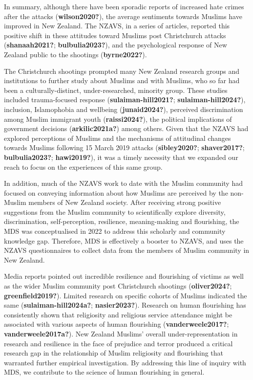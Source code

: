 \documentclass[
]{interact}
\begin{document}
In summary, although there have been sporadic reports of increased hate
crimes after the attacks (\textbf{wilson2020?}), the average sentiments
towards Muslims have improved in New Zealand. The NZAVS, in a series of
articles, reported this positive shift in these attitudes toward Muslims
post Christchurch attacks (\textbf{shanaah2021?};
\textbf{bulbulia2023?}), and the psychological response of New Zealand
public to the shootings (\textbf{byrne2022?}).

The Christchurch shootings prompted many New Zealand research groups and
institutions to further study about Muslims and with Muslims, who so far
had been a culturally-distinct, under-researched, minority group. These
studies included trauma-focused response (\textbf{sulaiman-hill2021?};
\textbf{sulaiman-hill2024?}), inclusion, Islamophobia and wellbeing
(\textbf{junaid2024?}), perceived discrimination among Muslim immigrant
youth (\textbf{raissi2024?}), the political implications of government
decisions (\textbf{arkilic2021a?}) among others. Given that the NZAVS
had explored perceptions of Muslims and the mechanisms of attitudinal
changes towards Muslims following 15 March 2019 attacks
(\textbf{sibley2020?}; \textbf{shaver2017?}; \textbf{bulbulia2023?};
\textbf{hawi2019?}), it was a timely necessity that we expanded our
reach to focus on the experiences of this same group.

In addition, much of the NZAVS work to date with the Muslim community
had focused on conveying information about how Muslims are perceived by
the non-Muslim members of New Zealand society. After receiving strong
positive suggestions from the Muslim community to scientifically explore
diversity, discrimination, self-perception, resilience, meaning-making
and flourishing, the MDS was conceptualised in 2022 to address this
scholarly and community knowledge gap. Therefore, MDS is effectively a
booster to NZAVS, and uses the NZAVS questionnaires to collect data from
the members of Muslim community in New Zealand.

Media reports pointed out incredible resilience and flourishing of
victims as well as the wider Muslim community post Christchurch
shootings (\textbf{oliver2024?}; \textbf{greenfield2019?}). Limited
research on specific cohorts of Muslims indicated the same
(\textbf{sulaiman-hill2024a?}; \textbf{nasier2023?}). Research on human
flourishing has consistently shown that religiosity and religious
service attendance might be associated with various aspects of human
flourishing (\textbf{vanderweele2017?}; \textbf{vanderweele2017a?}). New
Zealand Muslims' overall under-representation in research and resilience
in the face of prejudice and terror produced a critical research gap in
the relationship of Muslim religiosity and flourishing that warranted
further empirical investigation. By addressing this line of inquiry with
MDS, we contribute to the science of human flourishing in general.
\end{document}
